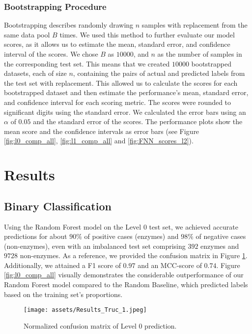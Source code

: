 \documentclass{bioinfo}
\begin{document}
\begin{methods}
\subsubsection{Bootstrapping Procedure}
Bootstrapping describes randomly drawing $n$ samples with replacement from the same data pool $B$ times.
We used this method to further evaluate our model scores, as it allows us to estimate the mean, standard error, and confidence interval of the scores.
We chose $B$ as $10000$, and $n$ as the number of samples in the corresponding test set.
This means that we created $10000$ bootstrapped datasets, each of size $n$, containing the pairs of actual and predicted labels from the test set with replacement.
This allowed us to calculate the scores for each bootstrapped dataset and then estimate the performance's mean, 
standard error, and confidence interval for each scoring metric.
The scores were rounded to significant digits using the standard error.
We calculated the error bars using an $\alpha$ of $0.05$ and the standard error of the scores.
The performance plots show the mean score and the confidence intervals as error bars (see Figure \ref{fig:l0_comp_all}, \ref{fig:l1_comp_all} and \ref{fig:FNN_scores_l2}).

\end{methods}

\clearpage
\section{Results}	

\subsection{Binary Classification}\label{sec:RF_level0}
Using the Random Forest model on the Level $0$ test set, we achieved accurate
predictions for about $90\%$ of positive cases (enzymes) and $98\%$ of negative
cases (non-enzymes), even with an imbalanced test set comprising $392$
enzymes and $9728$ non-enzymes. As a reference, we provided the confusion
matrix in Figure \ref{fig:RF_conf_l0}.
Additionally, we attained a F1 score of $0.97$ and an MCC-score of $0.74$. 
Figure \ref{fig:l0_comp_all} visually demonstrates the considerable outperformance of our Random Forest model 
compared to the Random Baseline, which predicted labels based on the training set's proportions.

\begin{figure}[!hb]
\texttt{[image: assets/Results\_Truc\_1.jpeg]}
\caption{Normalized confusion matrix of Level 0 prediction.}\label{fig:RF_conf_l0}
\end{figure}
\end{document}
